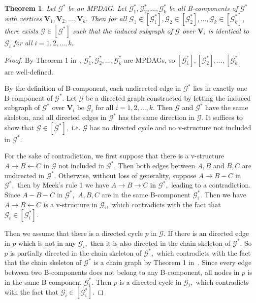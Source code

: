 \documentclass{article}
\newtheorem{theorem}{Theorem}
\begin{document}
\begin{theorem}
\label{thm:MEC decomposition}
Let $\mathcal{G}^*$ be an MPDAG. Let $\mathcal{G}^*_1,\mathcal{G}^*_2,\dots,\mathcal{G}^*_k$ be all B-components of $\mathcal{G}^*$ with vertices $\mathbf{V}_1,\mathbf{V}_2,\dots,\mathbf{V}_k.$ Then for all $\mathcal{G}_1\in [\mathcal{G}^*_1],\mathcal{G}_2\in [\mathcal{G}^*_2],\dots,\mathcal{G}_k\in [\mathcal{G}^*_k],$ there exists $\mathcal{G}\in [\mathcal{G}^*]$ such that the induced subgraph of $\mathcal{G}$ over $\mathbf{V}_i$ is identical to $\mathcal{G}_i$ for all $i=1,2,\dots,k.$
\end{theorem}
\begin{proof}
By Theorem 1 in~\citet{fang2022representation}, $\mathcal{G}^*_1,\mathcal{G}^*_2,\dots,\mathcal{G}^*_k$ are MPDAGs, so $[\mathcal{G}^*_1],[\mathcal{G}^*_2],\dots,[\mathcal{G}^*_k]$ are well-defined.

By the definition of B-component, each undirected edge in $\mathcal{G}^*$ lies in exactly one B-component of $\mathcal{G}^*.$ Let $\mathcal{G}$ be a directed graph constructed by letting the induced subgraph of $\mathcal{G}^*$ over $\mathbf{V}_i$ be $\mathcal{G}_i$ for all $i=1,2,\dots,k.$ Then $\mathcal{G}$ and $\mathcal{G}^*$ have the same skeleton, and all directed edges in $\mathcal{G}^*$ has the same direction in $\mathcal{G}.$ It suffices to show that $\mathcal{G}\in [\mathcal{G}^*],$ i.e. $\mathcal{G}$ has no directed cycle and no v-structure not included in $\mathcal{G}^*.$

For the sake of contradiction, we first suppose that there is a v-structure $A\to B\leftarrow C$ in $\mathcal{G}$ not included in $\mathcal{G}^*.$ Then both edges between $A,B$ and $B,C$ are undirected in $\mathcal{G}^*.$ Otherwise, without loss of generality, suppose $A\to B-C$ in $\mathcal{G}^*,$ then by Meek's rule 1 we have $A\to B\to C$ in $\mathcal{G}^*,$ leading to a contradiction. Since $A-B-C$ in $\mathcal{G}^*,$ $A,B,C$ are in the same B-component $\mathcal{G}^*_i.$ Then we have $A\to B\leftarrow C$ is a v-structure in $\mathcal{G}_i,$ which contradicts with the fact that $\mathcal{G}_i\in [\mathcal{G}^*_i].$

Then we assume that there is a directed cycle $p$ in $\mathcal{G}.$ If there is an directed edge in $p$ which is not in any $\mathcal{G}_i,$ then it is also directed in the chain skeleton of $\mathcal{G}^*.$ So $p$ is partially directed in the chain skeleton of $\mathcal{G}^*,$ which contradicts with the fact that the chain skeleton of $\mathcal{G}^*$ is a chain graph by Theorem 1 in~\citet{fang2022representation}. Since every edge between two B-components does not belong to any B-component, all nodes in $p$ is in the same B-component $\mathcal{G}^*_i.$ Then $p$ is a directed cycle in $\mathcal{G}_i,$ which contradicts with the fact that $\mathcal{G}_i\in [\mathcal{G}^*_i].$
\end{proof}
\end{document}
